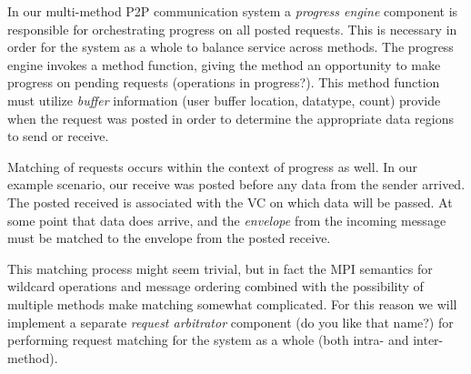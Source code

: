\begin{comment}
  it would be great if there were clear definitions of ``requests'' and
  ``operations'' around somewhere.
\end{comment}

In our multi-method P2P communication system a \emph{progress engine} component
is responsible for orchestrating progress on all posted requests.  This is
necessary in order for the system as a whole to balance service across methods.
The progress engine invokes a method function, giving the method an opportunity
to make progress on pending requests (operations in progress?).  This method
function must utilize \emph{buffer} information (user buffer location,
datatype, count) provide when the request was posted in order to determine the
appropriate data regions to send or receive.

Matching of requests occurs within the context of progress as well.  In our
example scenario, our receive was posted before any data from the sender
arrived.  The posted received is associated with the VC on which data will be
passed.  At some point that data does arrive, and the \emph{envelope} from
the incoming message must be matched to the envelope from the posted receive.

\begin{comment}
  \emph{define envelope?  point out that it should have been defined?}  briefly
  mention a definition and then point at another section for details (are there
  any details???)
\end{comment}

This matching process might seem trivial, but in fact the MPI semantics for
wildcard operations and message ordering combined with the possibility of
multiple methods make matching somewhat complicated.
For this reason we will implement a separate \emph{request arbitrator}
component (do you like that name?) for performing request matching for the
system as a whole (both intra- and inter-method).

\begin{comment}
  \emph{arbitrator: find something better than matcher that doesn't have the negative conotation of arbitrator.}
\end{comment}

% 

